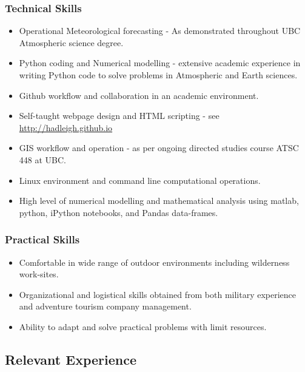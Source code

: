 \documentclass[]{article}
\begin{document}
\subsubsection*{Technical Skills}
\begin{itemize}
\item Operational Meteorological forecasting - As demonstrated throughout UBC Atmospheric science degree.
\item Python coding and Numerical modelling - extensive academic experience in writing Python code to solve problems in Atmospheric and Earth sciences.
\item Github workflow and collaboration in an academic environment.
\item Self-taught webpage design and HTML scripting - see \url{http://hadleigh.github.io}
\item GIS workflow and operation - as per ongoing directed studies course ATSC 448 at UBC.
\item Linux environment and command line computational operations.
\item High level of numerical modelling and mathematical analysis using matlab, python, iPython notebooks, and Pandas data-frames.
\end{itemize}
\subsubsection*{Practical Skills}
\begin{itemize}
\item Comfortable in wide range of outdoor environments including wilderness work-sites. 
\item Organizational and logistical skills obtained from both military experience and adventure tourism company management.
\item Ability to adapt and solve practical problems with limit resources.
\end{itemize}

\subsection*{Relevant Experience}
\end{document}
